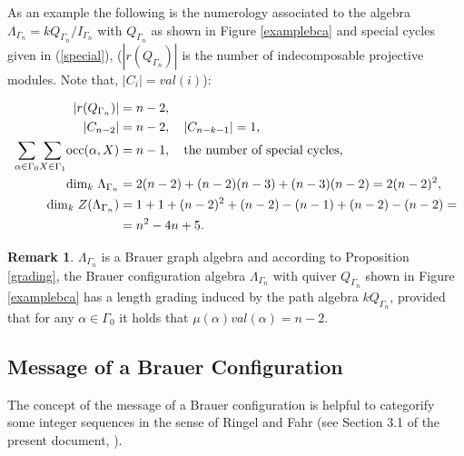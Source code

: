 \documentclass[10pt,twoside]{article}
\theoremstyle{definition}
\newtheorem{Nota}{Remark}
\begin{document}
As an example the following is the numerology associated to the algebra $\Lambda_{\Gamma_{n}}=kQ_{\Gamma_n}/I_{\Gamma_n}$ with $Q_{\Gamma_n}$ as shown in Figure \ref{examplebca} and special cycles given in (\ref{special}), ($|r(Q_{\Gamma_n})|$ is the number of indecomposable projective modules. Note that, $|C_{i}|=val(i)$):

\begin{equation*}\label{theexample}
\begin{split}
|r(Q_{\Gamma_n})|&=n-2,\\
|C_{n-2}|&=n-2, \quad|C_{n-k-1}|=1,\\
\underset{\alpha\in\Gamma_{0}}{\sum}\underset{X\in\Gamma_{1}}{\sum}\mathrm{occ}(\alpha, X)&= n-1,\quad\text{the number of special cycles},\\
\mathrm{dim}_{k}\hspace{0.1cm}\Lambda_{\Gamma_n}&=2(n-2)+(n-2)(n-3)+(n-3)(n-2)=2(n-2)^2,\\
\mathrm{dim}_{k}\hspace{0.1cm}Z(\Lambda_{\Gamma_{n}})&=1+1+(n-2)^2+(n-2)-(n-1)+(n-2)-(n-2)=\\
&= n^{2}-4n+5.\\
\end{split}
\end{equation*}
\addtocounter{Nota}{4}


\begin{Nota}
$\Lambda_{\Gamma_{n}}$ is a Brauer graph algebra and according to Proposition \ref{grading}, the Brauer configuration algebra $\Lambda_{\Gamma_{n}}$ with quiver $Q_{\Gamma_{n}}$ shown in Figure \ref{examplebca} has a length grading induced by the path algebra $kQ_{\Gamma_{n}}$, provided that for any $\alpha\in \Gamma_{0}$ it holds that $\mu(\alpha)val(\alpha)=n-2$.
\end{Nota}

\subsection{Message of a Brauer Configuration}\label{MBC}
The concept of the message of a Brauer configuration is helpful to categorify some integer sequences in the sense of Ringel and Fahr (see Section 3.1 of the present document, \cite{Fahr1, Fahr2}).\par\smallskip
\end{document}
